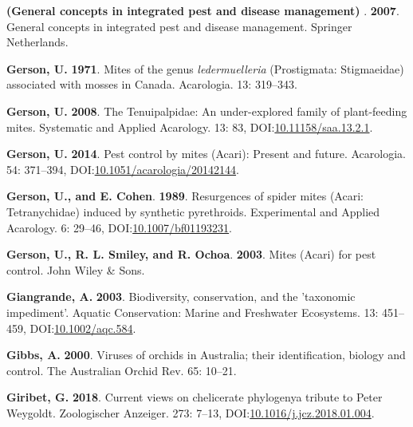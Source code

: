\documentclass[12pt,final,CPage]{ufthesis}
\newlength{\cslhangindent}
\newenvironment{CSLReferences}[2] %
{%
	\setlength{\parindent}{0pt}
	\ifodd #1 \everypar{\setlength{\hangindent}{\cslhangindent}}\ignorespaces\fi
	\ifnum #2 > 0
	\setlength{\parskip}{#2\baselineskip}
	\fi
}%
{}
\begin{document}
{\begin{CSLReferences}{1}{0}
  \leavevmode{}%
  \textbf{(General concepts in integrated pest and disease management) }. \textbf{2007}. General concepts in integrated pest and disease management. Springer Netherlands.

  \leavevmode{}%
  \textbf{Gerson, U.} \textbf{1971}. Mites of the genus \emph{ledermuelleria} ({Prostigmata}: {Stigmaeidae}) associated with mosses in {Canada}. Acarologia. 13: 319--343.

  \leavevmode{}%
  \textbf{Gerson, U.} \textbf{2008}. The {Tenuipalpidae}: An under-explored family of plant-feeding mites. Systematic and Applied Acarology. 13: 83, DOI:\href{https://doi.org/10.11158/saa.13.2.1}{10.11158/saa.13.2.1}.

  \leavevmode{}%
  \textbf{Gerson, U.} \textbf{2014}. Pest control by mites ({Acari}): Present and future. Acarologia. 54: 371--394, DOI:\href{https://doi.org/10.1051/acarologia/20142144}{10.1051/acarologia/20142144}.

  \leavevmode{}%
  \textbf{Gerson, U., and E. Cohen}. \textbf{1989}. Resurgences of spider mites ({Acari}: {Tetranychidae}) induced by synthetic pyrethroids. Experimental and Applied Acarology. 6: 29--46, DOI:\href{https://doi.org/10.1007/bf01193231}{10.1007/bf01193231}.

  \leavevmode{}%
  \textbf{Gerson, U., R. L. Smiley, and R. Ochoa}. \textbf{2003}. Mites ({Acari}) for pest control. John Wiley \& Sons.

  \leavevmode{}%
  \textbf{Giangrande, A.} \textbf{2003}. Biodiversity, conservation, and the 'taxonomic impediment'. Aquatic Conservation: Marine and Freshwater Ecosystems. 13: 451--459, DOI:\href{https://doi.org/10.1002/aqc.584}{10.1002/aqc.584}.

  \leavevmode{}%
  \textbf{Gibbs, A.} \textbf{2000}. Viruses of orchids in {Australia}; their identification, biology and control. The {Australia}n Orchid Rev. 65: 10--21.

  \leavevmode{}%
  \textbf{Giribet, G.} \textbf{2018}. Current views on chelicerate phylogeny{\textemdash}a tribute to {Peter Weygoldt}. Zoologischer Anzeiger. 273: 7--13, DOI:\href{https://doi.org/10.1016/j.jcz.2018.01.004}{10.1016/j.jcz.2018.01.004}.


\end{CSLReferences}}
\end{document}
